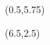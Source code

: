 \documentclass{beamer}
\begin{document}
\begin{textblock}{5.5}(0.5,5.75)
 

\end{textblock}

\begin{textblock}{8.5}(6.5,2.5)

\end{textblock}
\end{document}
